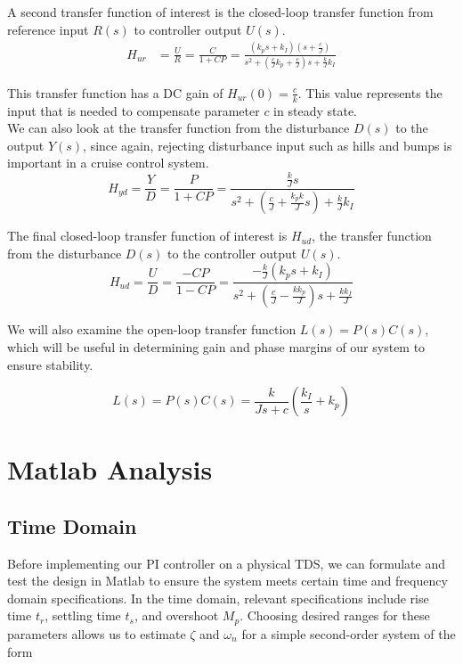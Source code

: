 \documentclass[11pt,titlepage]{article}
\begin{document}
	A second transfer function of interest is the closed-loop transfer function from reference input $R(s)$ to controller output $U(s)$.
	\begin{align}
		H_{ur}&=\frac{U}{R}=\frac{C}{1+CP}=\frac{(k_ps+k_I)(s+\frac{c}{J})}{s^2+(\frac{c}{J}k_p+\frac{c}{J})s+\frac{k}{J}k_I}
	\end{align}
	
	This transfer function has a DC gain of  $H_{ur}(0)=\frac{c}{k}$. This value represents the input that is needed to compensate parameter $c$ in steady state. \\
		
	We can also look at the transfer function from the disturbance $D(s)$ to the output $Y(s)$, since again, rejecting disturbance input such as hills and bumps is important in a cruise control system.
	\begin{equation}
		H_{yd}=\frac{Y}{D}=\frac{P}{1+CP}=\frac{\frac{k}{J}s}{s^2+(\frac{c}{J}+\frac{k_pk}{J}s)+\frac{k}{J}k_I}
	\end{equation}
	
	The final closed-loop transfer function of interest is $H_{ud}$, the transfer function from the disturbance $D(s)$ to the controller output $U(s)$. 
	\begin{equation}
		H_{ud}=\frac{U}{D}=\frac{-CP}{1-CP}=\frac{-\frac{k}{J}(k_ps+k_I)}{s^2+(\frac{c}{J}-\frac{kk_p}{J})s+\frac{kk_I}{J}}
	\end{equation}	
		
	We will also examine the open-loop transfer function $L(s)=P(s)C(s)$, which will be useful in determining gain and phase margins of our system to ensure stability.
	
	\begin{equation}
		L(s)=P(s)C(s)=	\frac{k}{Js+c}(\frac{k_I}{s}+k_p)
		\end{equation}


\section{Matlab Analysis}\label{sec:mat_anys}
    \subsection{Time Domain}
	    Before implementing our PI controller on a physical TDS, we can formulate and test the design in Matlab to ensure the system meets certain time and frequency domain specifications. In the time domain, relevant specifications include rise time $t_r$, settling time $t_s$, and overshoot $M_p$. Choosing desired ranges for these parameters allows us to estimate $\zeta$ and $\omega_{n}$ for a simple second-order system of the form
	    
\end{document}
